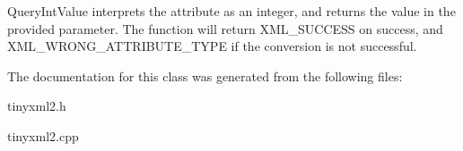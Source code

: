 Query\+Int\+Value interprets the attribute as an integer, and returns the value in the provided parameter. The function will return X\+M\+L\+\_\+\+S\+U\+C\+C\+E\+SS on success, and X\+M\+L\+\_\+\+W\+R\+O\+N\+G\+\_\+\+A\+T\+T\+R\+I\+B\+U\+T\+E\+\_\+\+T\+Y\+PE if the conversion is not successful. 

The documentation for this class was generated from the following files\+:\begin{DoxyCompactItemize}
\item 
tinyxml2.\+h\item 
tinyxml2.\+cpp\end{DoxyCompactItemize}
